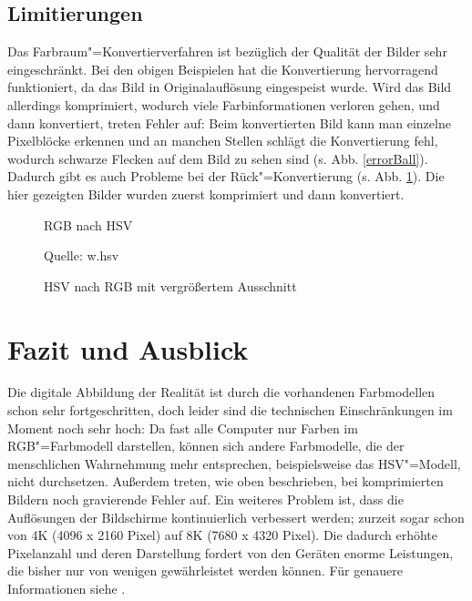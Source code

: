 \documentclass[a4paper,12pt,abstracton,titlepage]{scrartcl}
\begin{document}
\subsection{Limitierungen}
Das Farbraum"=Konvertierverfahren ist bezüglich der Qualität der Bilder sehr eingeschränkt. Bei den obigen Beispielen hat die Konvertierung hervorragend funktioniert, da das Bild in Originalauflösung eingespeist wurde. Wird das Bild allerdings komprimiert, wodurch viele Farbinformationen verloren gehen, und  dann konvertiert, treten Fehler auf: Beim konvertierten Bild kann man einzelne Pixelblöcke erkennen und an manchen Stellen schlägt die Konvertierung fehl, wodurch schwarze Flecken auf dem Bild zu sehen sind (s. Abb. \ref{errorBall}). Dadurch gibt es auch Probleme bei der Rück"=Konvertierung (s. Abb. \ref{errorBallRGB}). Die hier gezeigten Bilder wurden zuerst komprimiert und dann konvertiert.
\newpage
\begin{figure}[htbp]
\begin{minipage}[t]{0.48\textwidth}
  \begin{center}
    \caption{RGB nach HSV}
    \label{errorBall}
    \begin{small}
    Quelle: w.hsv
    \end{small}
  \end{center}
\end{minipage}
\begin{minipage}[t]{0.48\textwidth}
  \begin{center}
    \caption{HSV nach RGB mit vergrößertem Ausschnitt}
    \label{errorBallRGB}
  \end{center}
\end{minipage}
\end{figure}


\section{Fazit und Ausblick}
Die digitale Abbildung der Realität ist durch die vorhandenen Farbmodellen schon sehr fortgeschritten, doch leider sind die technischen Einschränkungen im Moment noch sehr hoch: Da fast alle Computer nur Farben im RGB"=Farbmodell darstellen, können sich andere Farbmodelle, die der menschlichen Wahrnehmung mehr entsprechen, beispielsweise das HSV"=Modell, nicht durchsetzen. Außerdem treten, wie oben beschrieben, bei komprimierten Bildern noch gravierende Fehler auf. Ein weiteres Problem ist, dass die Auflösungen der Bildschirme kontinuierlich verbessert werden; zurzeit sogar schon von 4K (4096 x 2160 Pixel) auf 8K (7680 x 4320 Pixel). Die dadurch erhöhte Pixelanzahl und deren Darstellung fordert von den Geräten enorme Leistungen, die bisher nur von wenigen gewährleistet werden können. Für genauere Informationen siehe \cite{aufloesung}.
\end{document}
